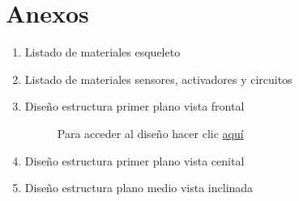 \onecolumn
\newpage
\section{Anexos} %
\label{sec:anexos} %
\thispagestyle{plain}


\begin{enumerate}[{Anexo} 1:]

    \item \label{a:materiales1} Listado de materiales esqueleto

        \begin{figure}[ht]
            \centering
            \caption{}
            \label{fig:esqueleto}
        \end{figure}

    \item \label{a:materiales2} Listado de materiales sensores, activadores y circuitos

        \begin{figure}[ht]
            \centering
            \caption{}
            \label{fig:senactcirc}
        \end{figure}

    \newpage
    \item \label{a:estruc_f} Diseño estructura primer plano vista frontal

        \begin{figure}[ht]
            \centering
            \caption{Para acceder al diseño hacer clic {\color{G} \href{https://poly.google.com/view/eg5UvBZqTdV}{aquí}}}
        \end{figure}

    \item \label{a:estruc_c} Diseño estructura primer plano vista cenital

        \begin{figure}[ht]
            \centering
            \caption{}
        \end{figure}

    \newpage
    \thispagestyle{plain}
    \item \label{a:estruc_d} Diseño estructura plano medio vista inclinada

        \begin{figure}[ht]
            \centering
            \caption{}
            \label{fig:estruct_m}
        \end{figure}


\end{enumerate}
